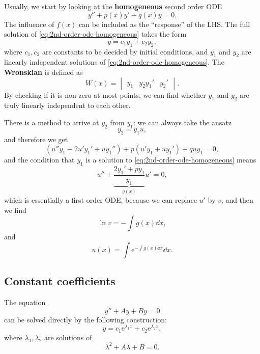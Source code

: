 \documentclass[hyperref, a4paper]{article}
\newcommand*{\ee}{\mathrm{e}}
\newcommand*{\concept}[1]{{\textbf{#1}}}
\def\\{}%
\begin{document}
Usually, we start by looking at 
the \concept{homogeneous} second order ODE 
\begin{equation}
    y'' + p(x) y' + q(x) y = 0.
    \label{eq:2nd-order-ode-homogeneous}
\end{equation}
The influence of $f(x)$ can be included as the 
``response'' of the LHS.
The full solution of \eqref{eq:2nd-order-ode-homogeneous}
takes the form 
\begin{equation}
    y = c_1 y_1 + c_2 y_2,
\end{equation}
where $c_1, c_2$ are constants to be decided 
by initial conditions,
and $y_1$ and $y_2$ are linearly independent solutions 
of \eqref{eq:2nd-order-ode-homogeneous}.
The \concept{Wronskian} is defined as 
\begin{equation}
    W(x) = 
    \begin{vmatrix}
        y_1 & y_2 \\ y_1' & y_2'
    \end{vmatrix}.
\end{equation} 
By checking if it is non-zero at most points,
we can find whether $y_1$ and $y_2$ are truly linearly independent to each other.

There is a method to arrive at $y_2$ from $y_1$:
we can always take the ansatz 
\begin{equation}
    y_2 = y_1 u, 
    \label{eq:from-y1-to-y2}
\end{equation}
and therefore we get 
\[
    (u'' y_1 + 2 u' y_1' + u y_1'')
    + p (u' y_1 + u y_1')
    + q u y_1 = 0,
\]
and the condition that $y_1$ is a solution to 
\eqref{eq:2nd-order-ode-homogeneous} means 
\begin{equation}
    u'' + \underbrace{\frac{2y_1' + p y_1}{y_1}}_{g(x)} u' = 0,
\end{equation}
which is essentially a first order ODE, 
because we can replace $u'$ by $v$,
and then we find 
\[
    \ln v = - \int g(x) \dd{x},
\]
and 
\begin{equation}
    u(x) = \int \ee^{- \int g(x) \dd{x}} \dd{x}.
\end{equation}

\subsection{Constant coefficients}

The equation 
\begin{equation}
    y'' + A y + By = 0
\end{equation}
can be solved directly by the following construction:
\begin{equation}
    y = c_1 \ee^{\lambda_1 x} + c_2 \ee^{\lambda_2 x},
\end{equation}
where $\lambda_1, \lambda_2$ are solutions of 
\begin{equation}
    \lambda^2 + A \lambda + B = 0.
    \label{eq:character-eq}
\end{equation}
\end{document}

